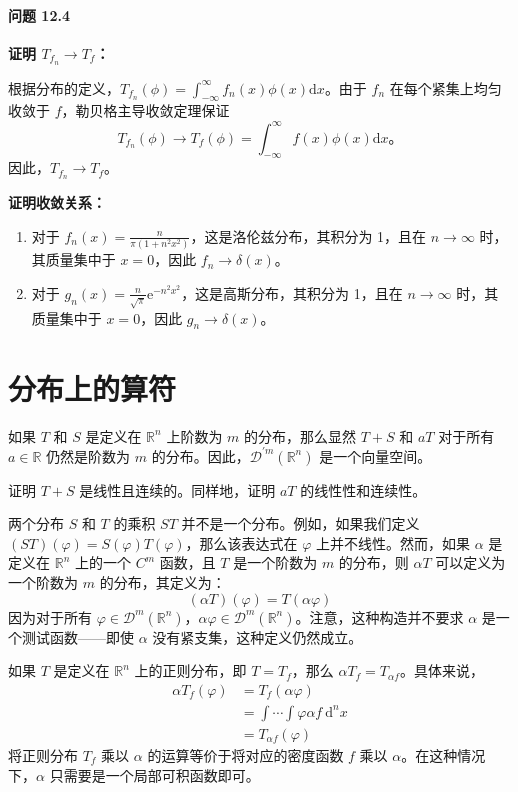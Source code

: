 \paragraph{问题 12.4}\label{ux95eeux9898-12.4}

\textbf{证明 $T_{f_n} \to T_f$：}

根据分布的定义，$T_{f_n}(\phi) = \int_{-\infty}^\infty f_n(x) \phi(x) \mathrm{d}x$。由于
$f_n$ 在每个紧集上均匀收敛于 $f$，勒贝格主导收敛定理保证
 $$
T_{f_n}(\phi) \to T_f(\phi) = \int_{-\infty}^\infty f(x) \phi(x) \mathrm{d}x。
$$
因此，$T_{f_n} \to T_f$。

\textbf{证明收敛关系：}

\begin{enumerate}
\def\labelenumi{\arabic{enumi}.}
\item
  对于 $f_n(x) = \frac{n}{\pi(1 + n^2 x^2)}$，这是洛伦兹分布，其积分为
  1，且在 $n \to \infty$ 时，其质量集中于 $x = 0$，因此
  $f_n \to \delta(x)$。
\item
  对于
  $g_n(x) = \frac{n}{\sqrt{\pi}} \mathrm{e}^{-n^2 x^2}$，这是高斯分布，其积分为
  1，且在 $n \to \infty$ 时，其质量集中于 $x = 0$，因此
  $g_n \to \delta(x)$。
\end{enumerate}

\section{分布上的算符}\label{sec:12.2}

如果 $T$ 和 $S$ 是定义在 $\mathbb{R}^n$ 上阶数为 $m$
的分布，那么显然 $T + S$ 和 $a T$ 对于所有 $a \in \mathbb{R}$
仍然是阶数为 $m$
的分布。因此，$\mathcal{D}^{\prime m}(\mathbb{R}^n)$ 是一个向量空间。
\begin{exercise}
  证明 $T + S$ 是线性且连续的。同样地，证明 $a T$
的线性性和连续性。
\end{exercise}

两个分布 $S$ 和 $T$ 的乘积 $S T$
并不是一个分布。例如，如果我们定义
$(S T)(\varphi) = S(\varphi) T(\varphi)$，那么该表达式在 $\varphi$
上并不线性。然而，如果 $\alpha$ 是定义在 $\mathbb{R}^n$ 上的一个
$C^m$ 函数，且 $T$ 是一个阶数为 $m$ 的分布，则 $\alpha T$
可以定义为一个阶数为 $m$ 的分布，其定义为：
 $$
(\alpha T)(\varphi) = T(\alpha \varphi)
$$
因为对于所有
$\varphi \in \mathcal{D}^m(\mathbb{R}^n)$，$\alpha \varphi \in \mathcal{D}^m(\mathbb{R}^n)$。注意，这种构造并不要求
$\alpha$ 是一个测试函数------即使 $\alpha$
没有紧支集，这种定义仍然成立。

如果 $T$ 是定义在 $\mathbb{R}^n$ 上的正则分布，即 $T = T_f$，那么
$\alpha T_f = T_{\alpha f}$。具体来说，
 $$
\begin{aligned}
\alpha T_f(\varphi) & = T_f(\alpha \varphi) \\
& = \int \cdots \int \varphi \alpha f \mathrm{~d}^n x \\
& = T_{\alpha f}(\varphi)
\end{aligned}
$$
将正则分布 $T_f$ 乘以 $\alpha$ 的运算等价于将对应的密度函数 $f$
乘以 $\alpha$。在这种情况下，$\alpha$ 只需要是一个局部可积函数即可。

